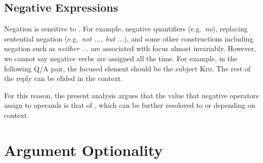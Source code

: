 \subsection{Negative Expressions}
\label{10:sssec:neg}


Negation is sensitive to  \citep{partee:91,krifka:08}. For example, negative quantifiers
(e.g.\ \textit{no}), replacing sentential negation
(e.g.\ \textit{not ..., but ...}), and some other constructions
including negation such as \textit{neither ...} are associated with
focus almost invariably.  However, we cannot say negative verbs are
assigned  all the time. For example, in the following Q/A
pair, the focused element should be the subject \textsc{Kim}. The rest
of the reply can be elided in the context.


\noindent For this reason, the present analysis argues that the value
that negative operators assign to operands is that of ,
which can be further resoloved to  or  depending on
context.



\section{Argument Optionality}
\label{10:sec:arg-opt}

